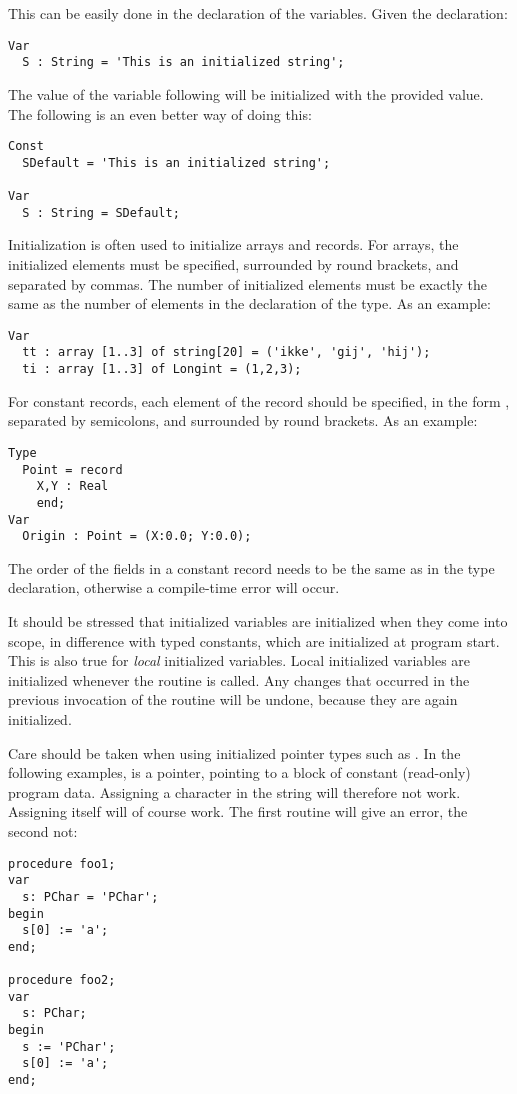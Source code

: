 This can be easily done in the declaration of the variables. 
Given the declaration:
\begin{verbatim}
Var
  S : String = 'This is an initialized string';
\end{verbatim}
The value of the variable following will be initialized with the provided
value. The following is an even better way of doing this:
\begin{verbatim}
Const
  SDefault = 'This is an initialized string';

Var
  S : String = SDefault;
\end{verbatim}
Initialization is often used to initialize arrays and records. For arrays,
the initialized elements must be specified, surrounded by round brackets, and
separated by commas. The number of initialized elements must be exactly the 
same as the number of elements in the declaration of the type.
As an example:
\begin{verbatim}
Var
  tt : array [1..3] of string[20] = ('ikke', 'gij', 'hij');
  ti : array [1..3] of Longint = (1,2,3);
\end{verbatim}
For constant records, each element of the record should be specified, in
the form , separated by semicolons, and surrounded by round
brackets.
As an example:
\begin{verbatim}
Type
  Point = record
    X,Y : Real
    end;
Var
  Origin : Point = (X:0.0; Y:0.0);
\end{verbatim}
The order of the fields in a constant record needs to be the same as in the type 
declaration, otherwise a compile-time error will occur.

\begin{remark}
It should be stressed that initialized variables are initialized when they
come into scope, in difference with typed constants, which are initialized 
at program start.
This is also true for {\em local} initialized variables. Local initialized
variables are initialized whenever the routine is called. Any changes that
occurred in the previous invocation of the routine will be undone, because
they are again initialized.
\end{remark}

\begin{remark}
Care should be taken when using initialized pointer types such as . 
In the following examples,  is a pointer, pointing to a block of constant
(read-only) program data.
Assigning a character in the string will therefore not work. Assigning  itself will
of course work. The first routine will give an error, the second not:
\begin{verbatim}
procedure foo1;
var
  s: PChar = 'PChar';
begin
  s[0] := 'a';
end;
 
procedure foo2;
var
  s: PChar;
begin
  s := 'PChar';
  s[0] := 'a';
end;
\end{verbatim}
\end{remark}

